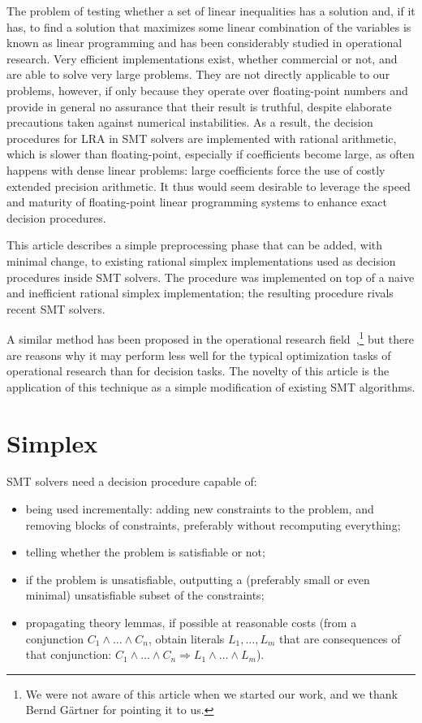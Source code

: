The problem of testing whether a set of linear inequalities has a solution and, if it has, to find a solution that maximizes some linear combination of the variables is known as linear programming and has been considerably studied in operational research. Very efficient implementations exist, whether commercial or not, and are able to solve very large problems. They are not directly applicable to our problems, however, if only because they operate over floating-point numbers and provide in general no assurance that their result is truthful, despite elaborate precautions taken against numerical instabilities. As a result, the decision procedures for LRA in SMT solvers are implemented with rational arithmetic, which is slower than floating-point, especially if coefficients become large, as often happens with dense linear problems: large coefficients force the use of costly extended precision arithmetic. It thus would seem desirable to leverage the speed and maturity of floating-point linear programming systems to enhance exact decision procedures.

This article describes a simple preprocessing phase that can be added, with minimal change, to existing rational simplex implementations used as decision procedures inside SMT solvers. The procedure was implemented on top of a naive and inefficient rational simplex implementation; the resulting procedure rivals recent SMT solvers.

A similar method has been proposed in the operational research field~\cite{Dihflaoui_et_al_SODA03},\footnote{We were not aware of this article when we started our work, and we thank Bernd G\"{a}rtner for pointing it to us.}
but there are reasons why it may perform less well for the typical optimization tasks of operational research than for decision tasks. The novelty of this article is the application of this technique as a simple modification of existing SMT algorithms.

\section{Simplex}
SMT solvers need a decision procedure capable of:
\begin{itemize}
\item being used incrementally: adding new constraints to the problem, and removing blocks of constraints, preferably without recomputing everything;
\item telling whether the problem is satisfiable or not;
\item if the problem is unsatisfiable, outputting a (preferably small or even minimal) unsatisfiable subset of the constraints;
\item propagating theory lemmas, if possible at reasonable costs (from a conjunction $C_1 \land \dots \land C_n$, obtain literals $L_1, \dots, L_m$ that are consequences of that conjunction: $C_1 \land \dots \land C_n \Rightarrow L_1 \land \dots \land L_m$).
\end{itemize}

